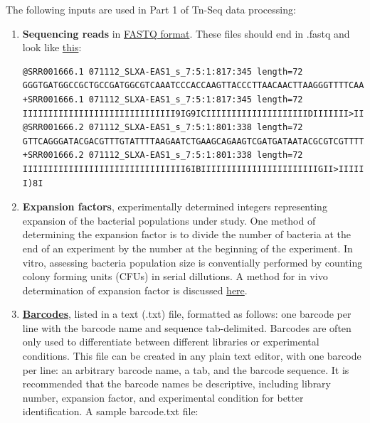 \documentclass[11pt,]{article}
\begin{document}
The following inputs are used in Part 1 of Tn-Seq data processing:

\begin{enumerate}
\def\labelenumi{\arabic{enumi}.}
\item
  \textbf{Sequencing reads} in
  \href{http://maq.sourceforge.net/fastq.shtml}{FASTQ format}. These
  files should end in .fastq and look like
  \href{https://en.wikipedia.org/wiki/FASTQ_format}{this}:

\begin{verbatim}
@SRR001666.1 071112_SLXA-EAS1_s_7:5:1:817:345 length=72
GGGTGATGGCCGCTGCCGATGGCGTCAAATCCCACCAAGTTACCCTTAACAACTTAAGGGTTTTCAAATAGA
+SRR001666.1 071112_SLXA-EAS1_s_7:5:1:817:345 length=72
IIIIIIIIIIIIIIIIIIIIIIIIIIIIII9IG9ICIIIIIIIIIIIIIIIIIIIIDIIIIIII>IIIIII/
@SRR001666.2 071112_SLXA-EAS1_s_7:5:1:801:338 length=72
GTTCAGGGATACGACGTTTGTATTTTAAGAATCTGAAGCAGAAGTCGATGATAATACGCGTCGTTTTATCAT
+SRR001666.2 071112_SLXA-EAS1_s_7:5:1:801:338 length=72
IIIIIIIIIIIIIIIIIIIIIIIIIIIIIIII6IBIIIIIIIIIIIIIIIIIIIIIIIGII>IIIII-I)8I
\end{verbatim}
\item
  \textbf{Expansion factors}, experimentally determined integers
  representing expansion of the bacterial populations under study. One
  method of determining the expansion factor is to divide the number of
  bacteria at the end of an experiment by the number at the beginning of
  the experiment. In vitro, assessing bacteria population size is
  conventially performed by counting colony forming units (CFUs) in
  serial dillutions. A method for in vivo determination of expansion
  factor is discussed
  \href{http://www.ncbi.nlm.nih.gov/pmc/articles/PMC3514683/}{here}.
\item
  \textbf{\href{http://hannonlab.cshl.edu/fastx_toolkit/commandline.html\#fastx_barcode_splitter_usage}{Barcodes}},
  listed in a text (.txt) file, formatted as follows: one barcode per
  line with the barcode name and sequence tab-delimited. Barcodes are
  often only used to differentiate between different libraries or
  experimental conditions. This file can be created in any plain text
  editor, with one barcode per line: an arbitrary barcode name, a tab,
  and the barcode sequence. It is recommended that the barcode names be
  descriptive, including library number, expansion factor, and
  experimental condition for better identification. A sample barcode.txt
  file:


\end{enumerate}
\end{document}
